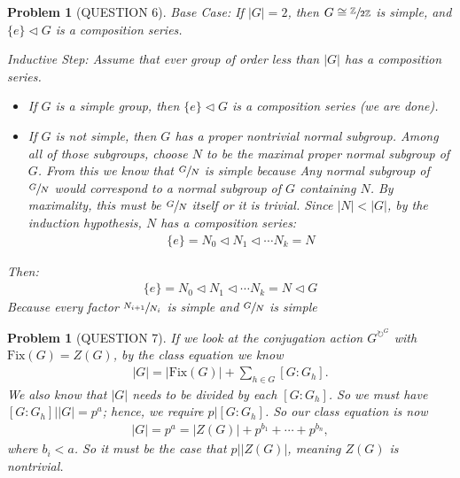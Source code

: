 \documentclass[titlepage]{article}
\theoremstyle{plain}
\newtheorem{problem}[theorem]{Problem}
\theoremstyle{definition}
\theoremstyle{remark}
\theoremstyle{exercise-style}
\numberwithin{equation}{section}
\numberwithin{theorem}{section}
\numberwithin{remark}{section}
\begin{document}
\begin{problem}[QUESTION 6]
    Base Case:  If $|G|=2$, then $G \cong \sfrac{\mathbb{Z}}{2 \mathbb{Z}}$ is simple, and $\{ e \} \triangleleft G$ is a composition series.
    
    \vspace{10pt}

    Inductive Step: Assume that ever group of order less than $|G|$ has a composition series.
    \begin{itemize}
        \item If $G$ is a simple group, then $\{ e \} \triangleleft G$ is a composition series (we are done). 
        \item If $G$ is not simple, then $G$ has a proper nontrivial normal subgroup. Among all of those subgroups, choose $N$ to be the maximal proper normal subgroup of $G$. From this we know that $\sfrac{G}{N}$ is simple because Any normal subgroup of $\sfrac{G}{N}$ would correspond to a normal subgroup of $G$ containing $N$. By maximality, this must be $\sfrac{G}{N}$ itself or it is trivial. Since $|N| < |G|$, by the induction hypothesis, $N$ has a composition series:
        \begin{align}
            \{ e \} = N_0 \triangleleft N_1 \triangleleft \cdots N_k = N
        \end{align}
    \end{itemize}
    Then: 
    \begin{align}
        \{ e \} = N_0 \triangleleft N_1 \triangleleft \cdots N_k = N \triangleleft G
    \end{align}
    Because every factor $\sfrac{N_{i+1}}{N_i}$ is simple and $\sfrac{G}{N}$ is simple 
\end{problem}

\begin{problem}[QUESTION 7]
    If we look at the conjugation action $G^{\circlearrowright^G}$ with $\mathrm{Fix}(G)= Z(G)$, by the class equation we know 
    \begin{align}
        |G| = |\mathrm{Fix}(G)| + \sum_{h \in G} [G:G_h].
    \end{align}
    We also know that $|G|$ needs to be divided by each $[G:G_h]$. So we must have $[G:G_h]||G|=p^a$; hence, we require $p|[G:G_h]$. So our class equation is now
    \begin{align}
        |G|= p^a = |Z(G)| + p^{b_1}+\cdots + p^{b_n},
    \end{align}
    where $b_i < a$. So it must be the case that $p||Z(G)|$, meaning $Z(G)$ is nontrivial.
\end{problem}
\end{document}

